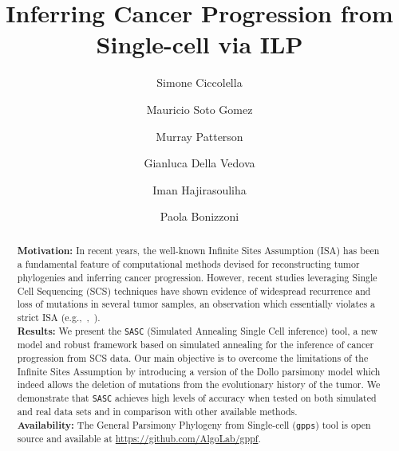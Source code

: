 \documentclass[a4paper,USenglish]{article}
\newcommand{\eg}{e.g.,~}
\theoremstyle{definition}
\begin{document}
\title{Inferring Cancer Progression from Single-cell via ILP}
\author{Simone Ciccolella \and   Mauricio Soto Gomez \and
  Murray Patterson \and
  Gianluca Della Vedova \and
  Iman Hajirasouliha \and
  Paola Bonizzoni}

\maketitle

\begin{abstract}
\textbf{Motivation:} In recent years, the well-known Infinite Sites Assumption (ISA) has been a fundamental feature of computational methods devised for reconstructing tumor phylogenies and inferring cancer progression. However, recent studies leveraging Single Cell Sequencing (SCS) techniques have shown evidence of widespread recurrence and loss of mutations in several tumor samples, an observation which essentially violates a strict ISA (\eg,~\cite{Kuipers13102017}).\\
\textbf{Results:} We present the \texttt{SASC} (Simulated Annealing Single Cell inference) tool, a new model and robust framework based on simulated annealing for the inference of cancer progression from SCS data.
	Our main objective is to overcome the limitations of the Infinite Sites Assumption by introducing a version of the Dollo parsimony model which indeed allows the deletion of mutations from the evolutionary history of the tumor. 
	We demonstrate that \texttt{SASC} achieves high levels of accuracy when tested on both simulated and real data sets and in comparison with other available methods.\\
\textbf{Availability:} The General Parsimony Phylogeny from Single-cell (\texttt{gpps})
tool is open source and available at   \url{https://github.com/AlgoLab/gppf}.\\
\end{abstract}
\end{document}
